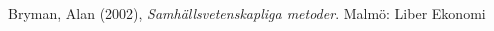 




\begin{thebibliography}{99}

  Bryman, Alan (2002),
  \emph{Samhällsvetenskapliga metoder}.
  Malmö: Liber Ekonomi
  
\end{thebibliography}

